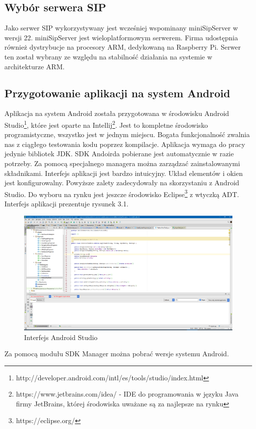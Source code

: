 \subsection{Wybór serwera SIP}
Jako serwer SIP wykorzystywany jest wcześniej wspominany miniSipServer w wersji 22. miniSipServer jest wieloplatformowym serwerem. Firma udostępnia również dystrybucje na procesory ARM, dedykowaną na Raspberry Pi. Serwer ten został wybrany ze względu na stabilność działania na systemie w architekturze ARM.
\subsection{Przygotowanie aplikacji na system Android}
Aplikacja na system Android została przygotowana w środowisku Android Studio\footnote{http://developer.android.com/intl/es/tools/studio/index.html}, które jest oparte na Intellij\footnote{https://www.jetbrains.com/idea/ - IDE do programowania w języku Java firmy JetBrains, której środowiska uważane są za najlepsze na rynku}. Jest to kompletne środowisko programistyczne, wszystko jest w jednym miejscu. Bogata funkcjonalność zwalnia nas z ciągłego testowania kodu poprzez kompilacje. Aplikacja wymaga do pracy jedynie bibliotek JDK. SDK Andoirda pobierane jest automatycznie w razie potrzeby. Za pomocą specjalnego managera można zarządzać zainstalowanymi składnikami. Interfejs aplikacji jest bardzo intuicyjny. Układ elementów i okien jest konfigurowalny. Powyższe zalety zadecydowały na skorzystaniu z Android Studio. Do wyboru na rynku jest jeszcze środowisko Eclipse\footnote{https://eclipse.org/} z wtyczką ADT. 
Interfejs aplikacji prezentuje rysunek 3.1.
\newpage
\begin{figure}[H]
	\centering
	\includegraphics[width=1\linewidth]{androidstudio}
	\caption{Interfejs Android Studio}
	\label{fig:androidstudio}
\end{figure}
Za pomocą modułu SDK Manager można pobrać wersje systemu Android.

